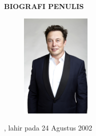 \begin{center}
  \Large
  \textbf{BIOGRAFI PENULIS}
\end{center}


\vspace{2ex}

\begin{figure}
  \centering
  \vspace{-3ex}
  \includegraphics[width=0.3\textwidth]{gambar/elon.jpg}
  \vspace{-4ex}
\end{figure}

\name{}, lahir pada 24 Agustus 2002 \lipsum[1]

\lipsum[2]
